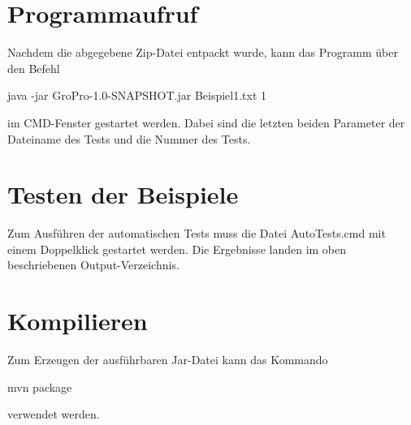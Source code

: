 \section{Programmaufruf}\label{sec:programmaufruf}
Nachdem die abgegebene Zip-Datei entpackt wurde, kann das Programm über den Befehl
\begin{center}
    \colorbox{gray!20}{
        \begin{minipage}{0.9\textwidth}
            java -jar GroPro-1.0-SNAPSHOT.jar Beispiel1.txt 1
        \end{minipage}
    }
\end{center}
im CMD-Fenster gestartet werden.
Dabei sind die letzten beiden Parameter der Dateiname des Tests und die Nummer des Tests.

\section{Testen der Beispiele}\label{sec:testen-der-beispiele}
Zum Ausführen der automatischen Tests muss die Datei \glqq AutoTests.cmd \grqq{} mit einem Doppelklick gestartet werden.
Die Ergebnisse landen im oben beschriebenen Output-Verzeichnis.

\section{Kompilieren}\label{sec:kompilieren}
Zum Erzeugen der ausführbaren Jar-Datei kann das Kommando
\begin{center}
    \colorbox{gray!20}{
        \begin{minipage}{0.9\textwidth}
            mvn package
        \end{minipage}
    }
\end{center}
verwendet werden.